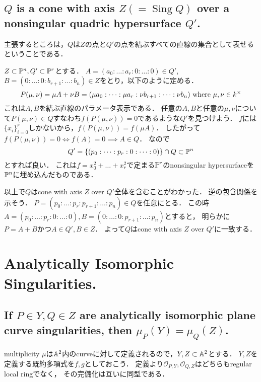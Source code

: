 \documentclass[a4paper]{jsarticle}
\newcommand{\Sing}{\operatorname{Sing}}
\begin{document}
    \subsection{$Q$ is a cone with axis $Z (=\Sing Q)$ over a nonsingular quadric hypersurface $Q'$.}
    主張するところは，$Q$は$Z$の点と$Q'$の点を結ぶすべての直線の集合として表せるということである．

    $Z \subset \mathbb{P}^n, Q' \subset \mathbb{P}^r$とする．
    $A=(a_0:\dots:a_r:0:\dots:0) \in Q'$, $B=(0:\dots:0:b_{r+1}:\dots:b_n) \in Z$をとり，以下のように定める．
    \[ P(\mu,\nu)=\mu A+\nu B=(\mu a_0:\dots:\mu a_r:\nu b_{r+1}:\dots:\nu b_{n}) \text{ where } \mu, \nu \in k^{\times} \]
    これは$A, B$を結ぶ直線のパラメータ表示である．
    任意の$A,B$と任意の$\mu,\nu$について$P(\mu,\nu) \in Q$すなわち$f(P(\mu,\nu))=0$であるような$Q'$を見つけよう．
    $f$には$\{x_i\}_{i=0}^{r}$しかないから，$f(P(\mu,\nu))=f(\mu A)$．
    したがって$f(P(\mu,\nu))=0 \iff f(A)=0 \implies A \in Q$．
    なので
    \[ Q'=\{ (p_0:\dots:p_r:0:\dots:0) \} \cap Q \subset \mathbb{P}^n \]
    とすれば良い．
    これは$f=x_0^2+\dots+x_r^2$で定まる$\mathbb{P}^r$のnonsingular hypersurfaceを$\mathbb{P}^n$に埋め込んだものである．

    以上で$Q$はcone with axis $Z$ over $Q'$全体を含むことがわかった．
    逆の包含関係を示そう．
    $P=(p_0:\dots:p_r:p_{r+1}:\dots:p_n) \in Q$を任意にとる．
    この時$A=(p_0:\dots:p_r:0:\dots:0), B=(0:\dots:0:p_{r+1}:\dots:p_n)$とすると，
    明らかに$P=A+B$かつ$A \in Q', B \in Z$．
    よって$Q$はcone with axis $Z$ over $Q'$に一致する．

\section{ } %

\section{Analytically Isomorphic Singularities.} %
    \subsection{If $P \in Y, Q \in Z$ are analytically isomorphic plane curve singularities, then $\mu_P(Y)=\mu_Q(Z)$.}
    multiplicity $\mu$は$\mathbb{A}^2$内のcurveに対して定義されるので，$Y,Z \subset \mathbb{A}^2$とする．
    $Y,Z$を定義する既約多項式を$f,g$としておこう．
    定義より$\mathcal{O}_{P,Y}, \mathcal{O}_{Q,Z}$はどちらもregular local ringでなく，
    その完備化は互いに同型である．
\end{document}

